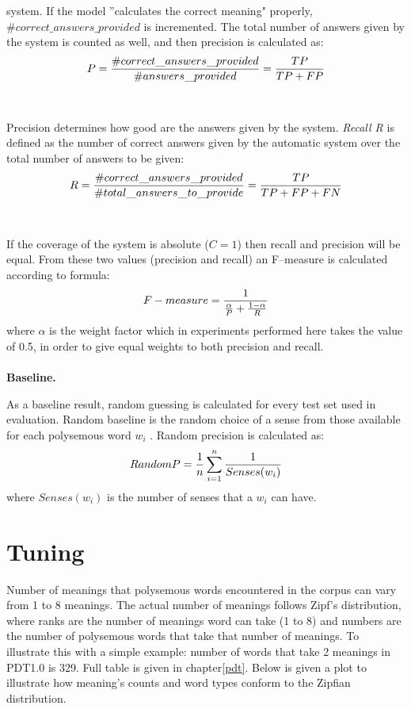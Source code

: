 system. If the model ''calculates the correct meaning" properly, $\#correct\_answers\_provided$ is 
incremented. The total number of answers given by the system is counted as well, and then precision 
is calculated as: 
\begin{equation}
\large{P=\frac{\#correct\_answers\_provided}{\#answers\_provided}=\frac{TP}{TP+FP}
}
\end{equation}
\\\\
Precision determines how good are the answers given by the system.
\textit{Recall R} is defined as the number of correct answers given by the automatic system
over the total number of answers to be given:
\begin{equation}
\large{
R=\frac{\#correct\_answers\_provided}{\#total\_answers\_to\_provide}=\frac{TP}{TP+FP+FN}
}
\end{equation}
\\\\
If the coverage of the system is absolute ($C=1$) then recall and precision will be equal. 
From these two values (precision and recall) an F--measure is calculated according to formula:
\begin{equation}
\large{
F-measure=\large{\frac{1}{\frac{\alpha}{P}+\frac{1-\alpha}{R}}}
}
\end{equation}
where $\alpha$ is the weight factor which in experiments performed here takes the value of 0.5, in order to give equal weights to both precision and recall. 
\\\\
\textbf{Baseline.}

As a baseline result, random guessing is calculated for every test set used in evaluation. Random baseline is the random choice of a sense from those available for each polysemous word $w_i$ . Random 
precision is calculated as:
\begin{equation}
\large{
RandomP=\frac{1}{n} \sum_{i=1}^{n}\frac{1}{Senses(w_i)}
}
\end{equation}
where $Senses(w_i)$ is the number of senses that a $w_i$ can have. 

\section{Tuning}
Number of meanings that polysemous words encountered in the corpus can vary from 1 to 8 meanings. The actual number of meanings follows Zipf's distribution, where ranks are the number of meanings word 
can take (1 to 8) and numbers are the number of polysemous words that take that number of meanings. 
To illustrate this with a simple example: number of words that take 2 meanings in PDT1.0 is 329. 
Full table is given in chapter\ref{pdt}. Below is given a plot to illustrate how meaning's counts and word 
types conform to the Zipfian distribution.

